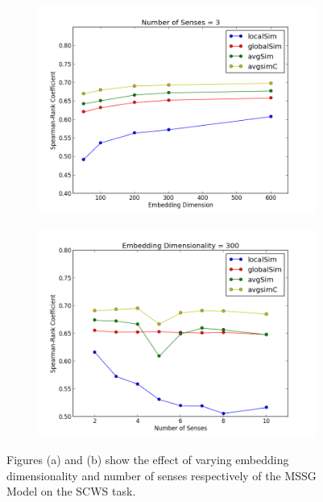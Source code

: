 \documentclass[11pt,a4paper]{article}
\begin{document}
\begin{figure}[t]
\centering
\begin{subfigure}[b]{.47\textwidth}
\includegraphics[width=\textwidth]{images/dim-plot.png}
\label{fig:sense} 
\caption{}
\end{subfigure}
\begin{subfigure}[b]{.47\textwidth}
\includegraphics[width=\textwidth]{images/sense-plot.png}
\label{fig:sense} 
\caption{}
\end{subfigure}

\caption{Figures (a) and (b) show the effect of varying embedding dimensionality and
number of senses respectively of the MSSG Model on the SCWS task.}
\end{figure}
\end{document}
